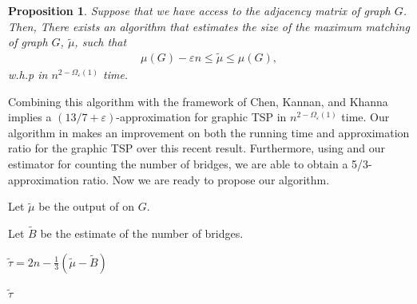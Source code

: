 \documentclass[letterpaper,11pt]{article}
\renewcommand{\epsilon}{\varepsilon}
\newtheorem{proposition}[theorem]{Proposition}
\begin{document}
\begin{proposition}\label{prop:matching-estimator}
    Suppose that we have access to the adjacency matrix of graph $G$. Then, There exists an algorithm that estimates the size of the maximum matching of graph $G$, $\tilde \mu$, such that
    \begin{align*}
        \mu(G) - \epsilon n \leq \tilde \mu \leq \mu(G),
    \end{align*}
    w.h.p in $n^{2-\Omega_\epsilon(1)}$ time.
\end{proposition}

Combining this algorithm with the framework of Chen, Kannan, and Khanna \cite{chen2020} implies a $(13/7+\epsilon)$-approximation for graphic TSP in $n^{2-\Omega_\epsilon(1)}$ time. Our algorithm in  makes an improvement on both the running time and approximation ratio for the graphic TSP over this recent result. Furthermore, using  and our estimator for counting the number of bridges, we are able to obtain a 5/3-approximation ratio. Now we are ready to propose our algorithm.


\begin{algorithm}
\caption{Slightly subquadratic algorithm for graphic TSP.}
\label{alg: graphic-tsp3}
    
    Let $\tilde{\mu}$ be the output of  on $G$.
    
    Let $\tilde{B}$ be the estimate of the number of bridges. 
    
    $\tilde{\tau} = 2n - \frac{1}{3}(\tilde{\mu} - \tilde{B})$
    
    \Return $\tilde{\tau}$
\end{algorithm}
\end{document}
